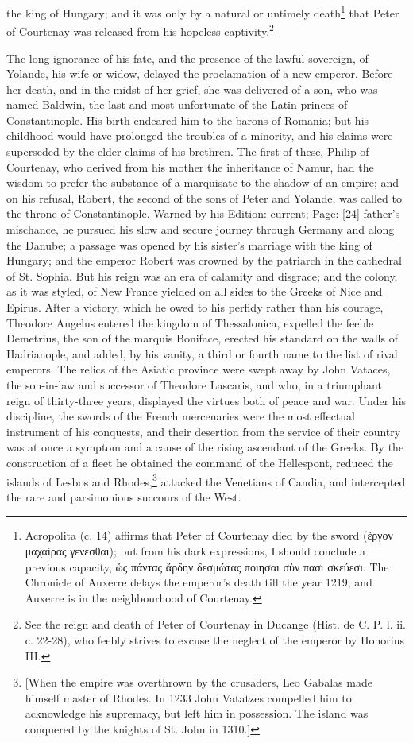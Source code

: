 the king of Hungary; and it was only by a natural or untimely death\footnote{Acropolita (c. 14) affirms that Peter of Courtenay died by the sword (\textgreek{\texthebrew{ἔ}ργον μαχαίρας γενέσθαι}); but from his dark expressions, I should conclude a previous capacity, \textgreek{\texthebrew{ὡ}ς πάντας \texthebrew{ἄ}ρδην δεσμώτας ποιησαι σ\texthebrew{ὑ}ν πασι σκεύεσι}. The Chronicle of Auxerre delays the emperor\texthebrew{}’s death till the year 1219; and Auxerre is in the neighbourhood of Courtenay.} that Peter of Courtenay was released from his hopeless captivity.\footnote{See the reign and death of Peter of Courtenay in Ducange (Hist. de C. P. l. ii. c. 22-28), who feebly strives to excuse the neglect of the emperor by Honorius III.}

The long ignorance of his fate, and the presence of the lawful sovereign, of Yolande, his wife or widow, delayed the proclamation of a new emperor. Before her death, and in the midst of her grief, she was delivered of a son, who was named Baldwin, the last and most unfortunate of the Latin princes of Constantinople. His birth endeared him to the barons of Romania; but his childhood would have prolonged the troubles of a minority, and his claims were superseded by the elder claims of his brethren. The first of these, Philip of Courtenay, who derived from his mother the inheritance of Namur, had the wisdom to prefer the substance of a marquisate to the shadow of an empire; and on his refusal, Robert, the second of the sons of Peter and Yolande, was called to the throne of Constantinople. Warned by his Edition: current; Page: [24] father\texthebrew{}’s mischance, he pursued his slow and secure journey through Germany and along the Danube; a passage was opened by his sister\texthebrew{}’s marriage with the king of Hungary; and the emperor Robert was crowned by the patriarch in the cathedral of St. Sophia. But his reign was an era of calamity and disgrace; and the colony, as it was styled, of New France yielded on all sides to the Greeks of Nice and Epirus. After a victory, which he owed to his perfidy rather than his courage, Theodore Angelus entered the kingdom of Thessalonica, expelled the feeble Demetrius, the son of the marquis Boniface, erected his standard on the walls of Hadrianople, and added, by his vanity, a third or fourth name to the list of rival emperors. The relics of the Asiatic province were swept away by John Vataces, the son-in-law and successor of Theodore Lascaris, and who, in a triumphant reign of thirty-three years, displayed the virtues both of peace and war. Under his discipline, the swords of the French mercenaries were the most effectual instrument of his conquests, and their desertion from the service of their country was at once a symptom and a cause of the rising ascendant of the Greeks. By the construction of a fleet he obtained the command of the Hellespont, reduced the islands of Lesbos and Rhodes,\footnote{[When the empire was overthrown by the crusaders, Leo Gabalas made himself master of Rhodes. In 1233 John Vatatzes compelled him to acknowledge his supremacy, but left him in possession. The island was conquered by the knights of St. John in 1310.]} attacked the Venetians of Candia, and intercepted the rare and parsimonious succours of the West. 